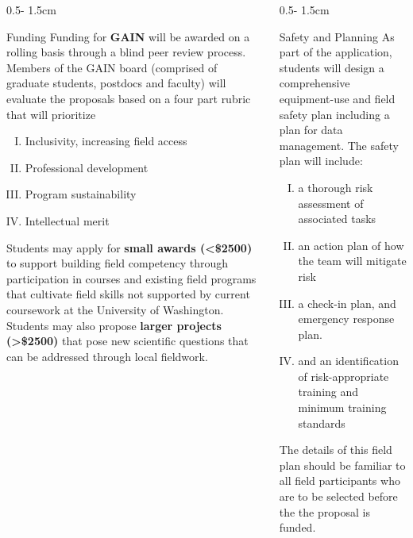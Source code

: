 \documentclass{uwposter}
\begin{document}
\begin{frame}
\begin{columns}[onlytextwidth]
\begin{column}{0.5\textwidth - 1.5cm}
\begin{block}{Funding}
        Funding for \textbf{\alert{GAIN}} will be awarded on a rolling basis through a blind peer review process. Members of the GAIN board (comprised of graduate students, postdocs and faculty) will evaluate the proposals based on a four part rubric that will prioritize 
        \begin{enumerate}[I.]
        \item
        Inclusivity, increasing field access
        \item
        Professional development
        \item
        Program sustainability 
        \item
        Intellectual merit
        \end{enumerate}

        Students may apply for \textbf{small awards (\alert{<\$2500})} to support building field competency through participation in courses and existing field programs that cultivate field skills not supported by current coursework at the University of Washington.
        Students may also propose \textbf{larger projects (\alert{>\$2500})} that pose new scientific questions that can be addressed through local fieldwork.
        

    \end{block}

\end{column}


\begin{column}{0.5\textwidth - 1.5cm}
       \begin{block}{Safety and Planning}
    As part of the application, students will design a comprehensive equipment-use and field safety plan including a plan for data management. The safety plan will include:
        \begin{enumerate}[I.]
         \item
    	a thorough risk assessment of associated tasks
    	\item
	an action plan of how the team will mitigate risk
    	\item
	a check-in plan, and emergency response plan.
    	\item
	and an identification of risk-appropriate training and minimum training standards
	\end{enumerate}
	
	The details of this field plan should be familiar to all field participants who are to be selected before the the proposal is funded.
    \end{block}
    

\end{column}
\end{columns}
\end{frame}
\end{document}
